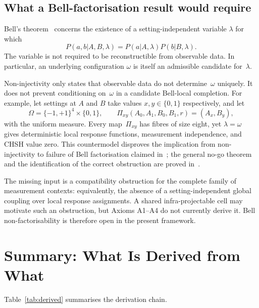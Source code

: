 \documentclass[11pt,a4paper]{article}
\begin{document}
  \subsection{What a Bell-factorisation result would require}

    Bell's theorem~\cite{Bell1964} concerns the existence of a setting-independent variable
    $\lambda$ for which
    \[
      P(a,b|A,B,\lambda)=P(a|A,\lambda)P(b|B,\lambda).
    \]
    The variable is not required to be reconstructible from observable data.
    In particular, an underlying configuration $\omega$ is itself an admissible candidate
    for~$\lambda$.

    Non-injectivity only states that observable data do not determine~$\omega$ uniquely.
    It does not prevent conditioning on~$\omega$ in a candidate Bell-local completion.
    For example, let settings at $A$ and $B$ take values $x,y\in\{0,1\}$ respectively, and let
    \[
      \Omega=\{-1,+1\}^{4}\times\{0,1\},
      \qquad
      \Pi_{xy}(A_0,A_1,B_0,B_1,r)=(A_x,B_y),
    \]
    with the uniform measure.
    Every map~$\Pi_{xy}$ has fibres of size eight, yet $\lambda=\omega$ gives deterministic
    local response functions, measurement independence, and CHSH value zero.
    This countermodel disproves the implication from non-injectivity to failure of Bell
    factorisation claimed in~\cite{Beau2026b}; the general no-go theorem and the identification
    of the correct obstruction are proved in~\cite{Beau2026BellNoGo}.

    The missing input is a compatibility obstruction for the complete family of
    measurement contexts: equivalently, the absence of a setting-independent global
    coupling over local response assignments.
    A shared infra-projectable cell may motivate such an obstruction, but Axioms A1--A4
    do not currently derive it.
    Bell non-factorisability is therefore open in the present framework.

    \clearpage
  \section{Summary: What Is Derived from What}
  \label{sec:summary}

  Table~\ref{tab:derived} summarises the derivation chain.
\end{document}
